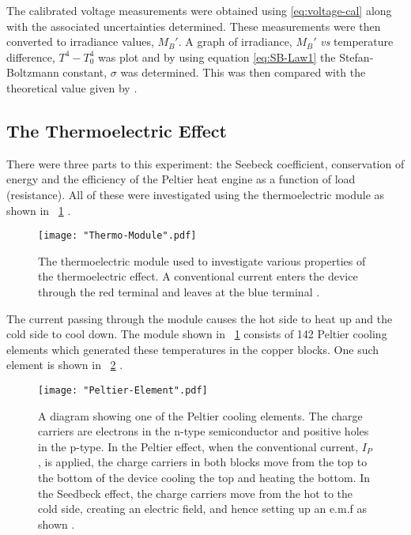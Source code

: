 \documentclass{article}
\newcommand{\figref}[2][\figurename~]{#1\ref{#2}}
\begin{document}
\vspace{2mm}
\noindent
The calibrated voltage measurements were obtained using \eqref{eq:voltage-cal} along with the associated uncertainties determined. These measurements were then converted to irradiance values, $M_B'$. A graph of irradiance, $M_B'$ \textit{vs} temperature difference, $T^4 - T_0^4$ was plot and by using equation \eqref{eq:SB-Law1} the Stefan-Boltzmann constant, $\sigma$ was determined. This was then compared with the theoretical value given by \cite{Paper01}.

\newpage
\subsection{The Thermoelectric Effect}
\label{ssec:thermoelectric-method}

There were three parts to this experiment: the Seebeck coefficient, conservation of energy and the efficiency of the Peltier heat engine as a function of load (resistance). All of these were investigated using the thermoelectric module as shown in \figref{fig:Thermo-Module} \cite{Paper02}. 

\begin{figure}[h]
\centering
\texttt{[image: "Thermo-Module".pdf]}
\caption{The thermoelectric module used to investigate various properties of the thermoelectric effect. A conventional current enters the device through the red terminal and leaves at the blue terminal \cite{Paper02}.}
\label{fig:Thermo-Module}
\end{figure}

\vspace{2mm}
\noindent
The current passing through the module causes the hot side to heat up and the cold side to cool down. The module shown in \figref{fig:Thermo-Module} consists of 142 Peltier cooling elements \cite{Paper02} which generated these temperatures in the copper blocks. One such element is shown in \figref{fig:Peltier-element} \cite{Paper02}.

\begin{figure}[h]
\centering
\texttt{[image: "Peltier-Element".pdf]}
\caption{A diagram showing one of the Peltier cooling elements. The charge carriers are electrons in the n-type semiconductor and positive holes in the p-type. In the Peltier effect,  when the conventional current, $I_P$, is applied, the charge carriers in both blocks move from the top to the bottom of the device \cite{Paper02} cooling the top and heating the bottom. In the Seedbeck effect, the charge carriers move from the hot to the cold side, creating an electric field, and hence setting up an e.m.f as shown \cite{Paper02}.}
\label{fig:Peltier-element}
\end{figure}
\end{document}
